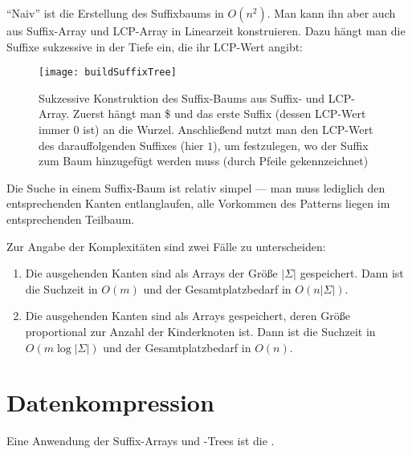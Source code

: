 ``Naiv'' ist die Erstellung des Suffixbaums in \( O(n^2) \). Man kann ihn aber auch aus Suffix-Array und LCP-Array in Linearzeit konstruieren. Dazu hängt man die Suffixe sukzessive in der Tiefe ein, die ihr LCP-Wert angibt:

\begin{figure}[H]
  \texttt{[image: buildSuffixTree]}
  \caption{Sukzessive Konstruktion des Suffix-Baums aus Suffix- und LCP-Array. Zuerst hängt man \$ und das erste Suffix (dessen LCP-Wert immer \( 0 \) ist) an die Wurzel. Anschließend nutzt man den LCP-Wert des darauffolgenden Suffixes (hier \( 1 \)), um festzulegen, wo der Suffix zum Baum hinzugefügt werden muss (durch Pfeile gekennzeichnet)}
\end{figure}

Die Suche in einem Suffix-Baum ist relativ simpel --- man muss lediglich den entsprechenden Kanten entlanglaufen, alle Vorkommen des Patterns liegen im entsprechenden Teilbaum.

Zur Angabe der Komplexitäten sind zwei Fälle zu unterscheiden:

\begin{enumerate}
  \item Die ausgehenden Kanten sind als Arrays der Größe \( \left\vert \Sigma \right\vert \) gespeichert. Dann ist die Suchzeit in \textcolor{green!60!black}{\( O(m) \)} und der Gesamtplatzbedarf in \textcolor{red!80!black}{\( O(n\left\vert \Sigma \right\vert) \)}.
  \item Die ausgehenden Kanten sind als Arrays gespeichert, deren Größe proportional zur Anzahl der Kinderknoten ist. Dann ist die Suchzeit in \textcolor{red!80!black}{\( O(m\log \left\vert \Sigma \right\vert ) \)} und der Gesamtplatzbedarf in \textcolor{green!60!black}{\( O(n) \)}.
\end{enumerate}

\section{Datenkompression}

Eine Anwendung der Suffix-Arrays und -Trees ist die .